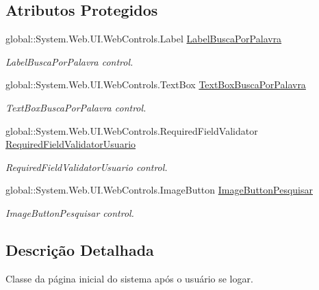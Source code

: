 \subsection*{Atributos Protegidos}
\begin{DoxyCompactItemize}
\item 
global::System.Web.UI.WebControls.Label \hyperlink{class_sistema_r_h_1_1_home_a46f42efda91d1c0554524de498dee67f}{LabelBuscaPorPalavra}
\begin{DoxyCompactList}\small\item\em LabelBuscaPorPalavra control. \item\end{DoxyCompactList}\item 
global::System.Web.UI.WebControls.TextBox \hyperlink{class_sistema_r_h_1_1_home_ae00e2dc131501fa120640462ce2d7c04}{TextBoxBuscaPorPalavra}
\begin{DoxyCompactList}\small\item\em TextBoxBuscaPorPalavra control. \item\end{DoxyCompactList}\item 
global::System.Web.UI.WebControls.RequiredFieldValidator \hyperlink{class_sistema_r_h_1_1_home_a263e0b47124122368f614ad28bb3c88b}{RequiredFieldValidatorUsuario}
\begin{DoxyCompactList}\small\item\em RequiredFieldValidatorUsuario control. \item\end{DoxyCompactList}\item 
global::System.Web.UI.WebControls.ImageButton \hyperlink{class_sistema_r_h_1_1_home_a5137ccb0763417f74e241a48eb7ad617}{ImageButtonPesquisar}
\begin{DoxyCompactList}\small\item\em ImageButtonPesquisar control. \item\end{DoxyCompactList}\end{DoxyCompactItemize}


\subsection{Descrição Detalhada}
Classe da página inicial do sistema após o usuário se logar. 

